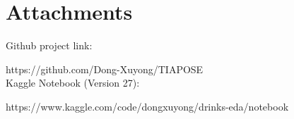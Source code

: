 \newpage
\section{Attachments}


\quad Github project link:


\quad \textbullet https://github.com/Dong-Xuyong/TIAPOSE\\


Kaggle Notebook (Version 27):


\quad \textbullet https://www.kaggle.com/code/dongxuyong/drinks-eda/notebook





